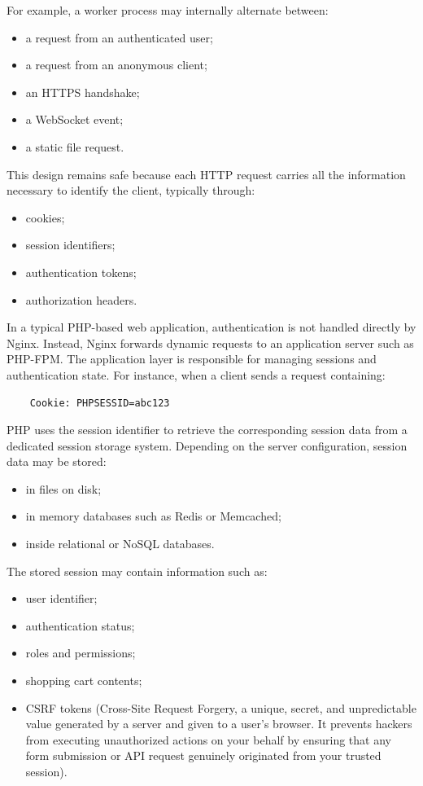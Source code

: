 \documentclass{scrbook}
\begin{document}
	For example, a worker process may internally alternate between:
	\begin{itemize}
		\item a request from an authenticated user;
		\item a request from an anonymous client;
		\item an HTTPS handshake;
		\item a WebSocket event;
		\item a static file request.
	\end{itemize}
	
	This design remains safe because each HTTP request carries all the information necessary to identify the client, typically through:
	\begin{itemize}
		\item cookies;
		\item session identifiers;
		\item authentication tokens;
		\item authorization headers.
	\end{itemize}
	
	In a typical PHP-based web application, authentication is not handled directly by Nginx. Instead, Nginx forwards dynamic requests to an application server such as PHP-FPM. The application layer is responsible for managing sessions and authentication state. For instance, when a client sends a request containing:
	
	\begin{verbatim}
	Cookie: PHPSESSID=abc123
	\end{verbatim}
	
	PHP uses the session identifier to retrieve the corresponding session data from a dedicated session storage system. Depending on the server configuration, session data may be stored:
	\begin{itemize}
		\item in files on disk;
		\item in memory databases such as Redis or Memcached;
		\item inside relational or NoSQL databases.
	\end{itemize}
	
	The stored session may contain information such as:
	\begin{itemize}
		\item user identifier;
		\item authentication status;
		\item roles and permissions;
		\item shopping cart contents;
		\item CSRF tokens (Cross-Site Request Forgery, a unique, secret, and unpredictable value generated by a server and given to a user's browser. It prevents hackers from executing unauthorized actions on your behalf by ensuring that any form submission or API request genuinely originated from your trusted session).
	\end{itemize}
	
\end{document}
